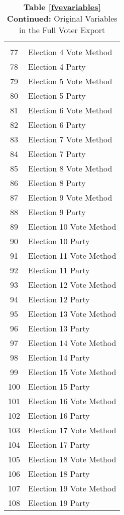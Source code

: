 \begin{table}[!htbp] \centering 
  \caption*{\textbf{Table \ref{fvevariables} Continued:} Original Variables in the Full Voter Export}
\small 
\begin{tabular}{@{\extracolsep{5pt}} cl}
\\[-1.8ex]\hline 
\hline \\[-1.8ex]  
77 & Election 4 Vote Method \\ 
78 & Election 4 Party \\ 
79 & Election 5 Vote Method \\ 
80 & Election 5 Party \\ 
81 & Election 6 Vote Method \\ 
82 & Election 6 Party \\ 
83 & Election 7 Vote Method \\ 
84 & Election 7 Party \\ 
85 & Election 8 Vote Method \\ 
86 & Election 8 Party \\ 
87 & Election 9 Vote Method \\ 
88 & Election 9 Party \\ 
89 & Election 10 Vote Method \\ 
90 & Election 10 Party \\ 
91 & Election 11 Vote Method \\ 
92 & Election 11 Party \\ 
93 & Election 12 Vote Method \\ 
94 & Election 12 Party \\ 
95 & Election 13 Vote Method \\ 
96 & Election 13 Party \\ 
97 & Election 14 Vote Method \\ 
98 & Election 14 Party \\ 
99 & Election 15 Vote Method \\ 
100 & Election 15 Party \\ 
101 & Election 16 Vote Method \\ 
102 & Election 16 Party \\ 
103 & Election 17 Vote Method \\ 
104 & Election 17 Party \\ 
105 & Election 18 Vote Method \\ 
106 & Election 18 Party \\ 
107 & Election 19 Vote Method \\ 
108 & Election 19 Party \\ 

\end{tabular}
\end{table}
